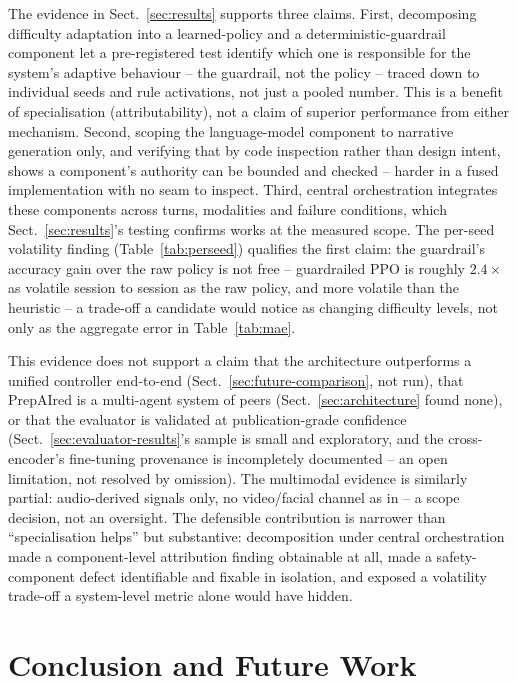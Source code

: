 \documentclass[runningheads]{llncs}
\begin{document}
The evidence in Sect.~\ref{sec:results} supports three claims. First, decomposing difficulty adaptation into a learned-policy and a deterministic-guardrail component let a pre-registered test identify which one is responsible for the system's adaptive behaviour -- the guardrail, not the policy -- traced down to individual seeds and rule activations, not just a pooled number. This is a benefit of specialisation (attributability), not a claim of superior performance from either mechanism. Second, scoping the language-model component to narrative generation only, and verifying that by code inspection rather than design intent, shows a component's authority can be bounded and checked -- harder in a fused implementation with no seam to inspect. Third, central orchestration integrates these components across turns, modalities and failure conditions, which Sect.~\ref{sec:results}'s testing confirms works at the measured scope. The per-seed volatility finding (Table~\ref{tab:perseed}) qualifies the first claim: the guardrail's accuracy gain over the raw policy is not free -- guardrailed PPO is roughly $2.4\times$ as volatile session to session as the raw policy, and more volatile than the heuristic -- a trade-off a candidate would notice as changing difficulty levels, not only as the aggregate error in Table~\ref{tab:mae}.

This evidence does not support a claim that the architecture outperforms a unified controller end-to-end (Sect.~\ref{sec:future-comparison}, not run), that PrepAIred is a multi-agent system of peers (Sect.~\ref{sec:architecture} found none), or that the evaluator is validated at publication-grade confidence (Sect.~\ref{sec:evaluator-results}'s sample is small and exploratory, and the cross-encoder's fine-tuning provenance is incompletely documented -- an open limitation, not resolved by omission). The multimodal evidence is similarly partial: audio-derived signals only, no video/facial channel as in \cite{key14,key15} -- a scope decision, not an oversight. The defensible contribution is narrower than ``specialisation helps'' but substantive: decomposition under central orchestration made a component-level attribution finding obtainable at all, made a safety-component defect identifiable and fixable in isolation, and exposed a volatility trade-off a system-level metric alone would have hidden.

\section{Conclusion and Future Work}
\end{document}
